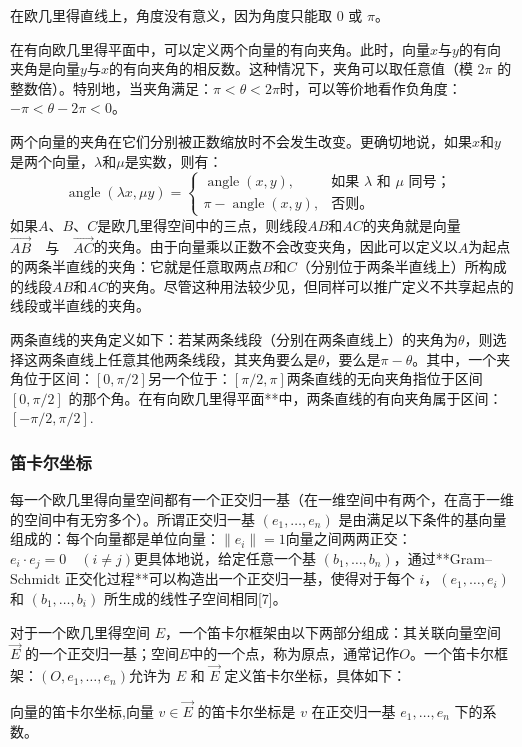 在欧几里得直线上，角度没有意义，因为角度只能取 $0$ 或 $\pi$。

在有向欧几里得平面中，可以定义两个向量的有向夹角。此时，向量$x$与$y$的有向夹角是向量$y$与$x$的有向夹角的相反数。这种情况下，夹角可以取任意值（模 $2\pi$ 的整数倍）。特别地，当夹角满足：$\pi < \theta < 2\pi$时，可以等价地看作负角度：$-\pi < \theta - 2\pi < 0$。

两个向量的夹角在它们分别被正数缩放时不会发生改变。更确切地说，如果$x$和$y$是两个向量，$\lambda$和$\mu$是实数，则有：
$$
\operatorname{angle}(\lambda x, \mu y) =
\begin{cases}
\operatorname{angle}(x, y), & \text{如果 } \lambda \text{ 和 } \mu \text{ 同号；} \\[6pt]
\pi - \operatorname{angle}(x, y), & \text{否则。}
\end{cases}~
$$
如果$A$、$B$、$C$是欧几里得空间中的三点，则线段$AB$和$AC$的夹角就是向量$\overrightarrow{AB} \quad \text{与} \quad \overrightarrow{AC}$的夹角。由于向量乘以正数不会改变夹角，因此可以定义以$A$为起点的两条半直线的夹角：它就是任意取两点$B$和$C$（分别位于两条半直线上）所构成的线段$AB$和$AC$的夹角。尽管这种用法较少见，但同样可以推广定义不共享起点的线段或半直线的夹角。

两条直线的夹角定义如下：若某两条线段（分别在两条直线上）的夹角为$\theta$，则选择这两条直线上任意其他两条线段，其夹角要么是$\theta$，要么是$\pi - \theta$。其中，一个夹角位于区间：$[0, \pi/2]$另一个位于：$[\pi/2, \pi]$两条直线的无向夹角指位于区间 $[0, \pi/2]$ 的那个角。在有向欧几里得平面**中，两条直线的有向夹角属于区间：$[-\pi/2, \pi/2]$.
\subsubsection{笛卡尔坐标}
每一个欧几里得向量空间都有一个正交归一基（在一维空间中有两个，在高于一维的空间中有无穷多个）。所谓正交归一基 $(e_1, \dots, e_n)$ 是由满足以下条件的基向量组成的：每个向量都是单位向量：$\|e_i\| = 1$向量之间两两正交：$e_i \cdot e_j = 0 \quad (i \ne j)$更具体地说，给定任意一个基 $(b_1, \dots, b_n)$，通过**Gram–Schmidt 正交化过程**可以构造出一个正交归一基，使得对于每个 $i$，$(e_1, \dots, e_i)$ 和 $(b_1, \dots, b_i)$ 所生成的线性子空间相同[7]。

对于一个欧几里得空间 $E$，一个笛卡尔框架由以下两部分组成：其关联向量空间 $\overrightarrow{E}$ 的一个正交归一基；空间$E$中的一个点，称为原点，通常记作$O$。一个笛卡尔框架：$(O, e_1, \dots, e_n)$允许为 $E$ 和 $\overrightarrow{E}$ 定义笛卡尔坐标，具体如下：

向量的笛卡尔坐标,向量 $v \in \overrightarrow{E}$ 的笛卡尔坐标是 $v$ 在正交归一基 $e_1, \dots, e_n$ 下的系数。

